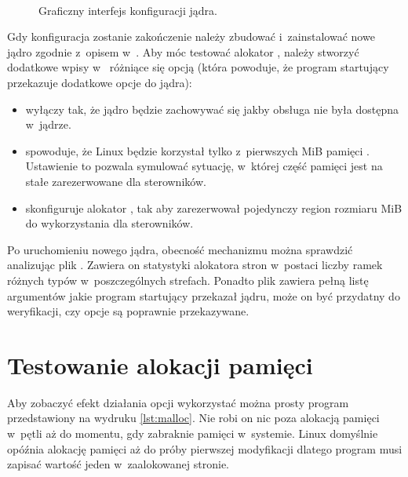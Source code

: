 \begin{figure}[tbp]
  \centering
   \\
  \caption{Graficzny interfejs konfiguracji jądra.}
  \label{fig:xconfig}
\end{figure}

Gdy konfiguracja zostanie zakończenie należy zbudować i~zainstalować
nowe jądro zgodnie z~opisem w~\autocite{bib:building-linux}.  Aby móc
testować alokator , należy stworzyć dodatkowe wpisy
w~ różniące się opcją  (która
powoduje, że program startujący przekazuje dodatkowe opcje do jądra):

\begin{itemize}
\item {} wyłączy  tak, że jądro będzie
  zachowywać się jakby obsługa  nie była dostępna w~jądrze.
\item {} spowoduje, że Linux będzie
  korzystał tylko z~pierwszych \unit[512]{MiB} pamięci .  Ustawienie
  to pozwala symulować sytuację, w~której część pamięci jest na stałe
  zarezerwowane dla sterowników.
\item {} skonfiguruje alokator , tak aby
  zarezerwował pojedynczy region rozmiaru \unit[512]{MiB} do
  wykorzystania dla sterowników.
\end{itemize}

Po uruchomieniu nowego jądra, obecność mechanizmu  można sprawdzić
analizując plik .  Zawiera on statystyki
alokatora stron w~postaci liczby ramek różnych typów w~poszczególnych
strefach.  Ponadto plik  zawiera pełną listę
argumentów jakie program startujący przekazał jądru, może on być
przydatny do weryfikacji, czy opcje są poprawnie przekazywane.


\section{Testowanie alokacji pamięci}

Aby zobaczyć efekt działania opcji  wykorzystać można prosty
program  przedstawiony na wydruku \ref{lst:malloc}.  Nie
robi on nic poza alokacją pamięci w~pętli aż do momentu, gdy zabraknie
pamięci w~systemie.  Linux domyślnie opóźnia alokację pamięci aż do
próby pierwszej modyfikacji dlatego program musi zapisać wartość jeden
w~zaalokowanej stronie.

